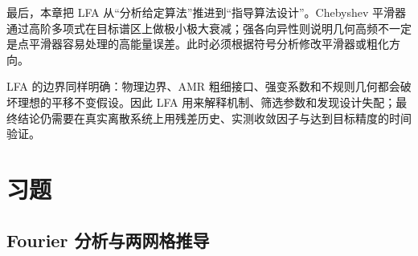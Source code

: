 最后，本章把 LFA 从“分析给定算法”推进到“指导算法设计”。Chebyshev 平滑器通过高阶多项式在目标谱区上做极小极大衰减；强各向异性则说明几何高频不一定是点平滑器容易处理的高能量误差。此时必须根据符号分析修改平滑器或粗化方向。

LFA 的边界同样明确：物理边界、AMR 粗细接口、强变系数和不规则几何都会破坏理想的平移不变假设。因此 LFA 用来解释机制、筛选参数和发现设计失配；最终结论仍需要在真实离散系统上用残差历史、实测收敛因子与达到目标精度的时间验证。

\section*{习题}

\subsection*{Fourier 分析与两网格推导}
